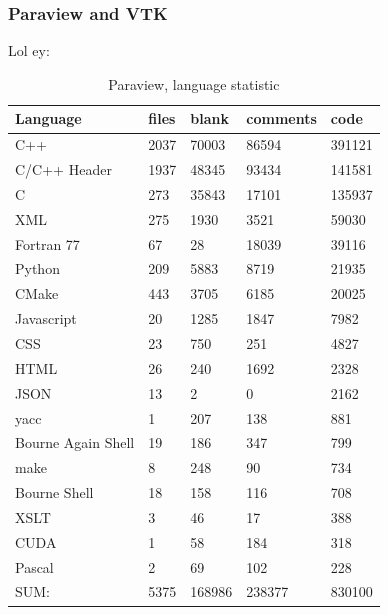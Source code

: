 \subsubsection{Paraview and VTK}
Lol ey: 
\begin{table}[h]
	\centering
	\caption{Paraview, language statistic}
    \sffamily 
	\begin{tabular}{ l|l|l|l|l }
		\hline
		\textbf{Language}              &\textbf{files} &\textbf{blank} &\textbf{comments} & \textbf{code} \\
		\hline
		C++                            &2037          &70003         &86594         & 391121\\
		C/C++ Header                   &1937          &48345         & 93434        & 141581\\
		C                              & 273          &35843         & 17101        & 135937\\
		XML                            & 275          & 1930         &  3521        &  59030\\
		Fortran 77                     &  67          &   28         & 18039        &  39116\\
		Python                         & 209          & 5883         &  8719        &  21935\\
		CMake                          & 443          & 3705         &  6185        &  20025\\
		Javascript                     &  20          & 1285         &  1847        &   7982\\
		CSS                            &  23          &  750         &   251        &   4827\\
		HTML                           &  26          &  240         &  1692        &   2328\\
		JSON                           &  13          &    2         &     0        &   2162\\
		yacc                           &   1          &  207         &   138        &    881\\
		Bourne Again Shell             &  19          &  186         &   347        &    799\\
		make                           &   8          &  248         &    90        &    734\\
		Bourne Shell                   &  18          &  158         &   116        &    708\\
		XSLT                           &   3          &   46         &    17        &    388\\
		CUDA                           &   1          &   58         &   184        &    318\\
		Pascal                         &   2          &   69         &   102        &    228\\
		\hline
		SUM:                           &5375         &168986         &238377         &830100\\
		\hline
	\end{tabular}
    \normalfont
    \label{table:ParaviewStatistic}
\end{table}

